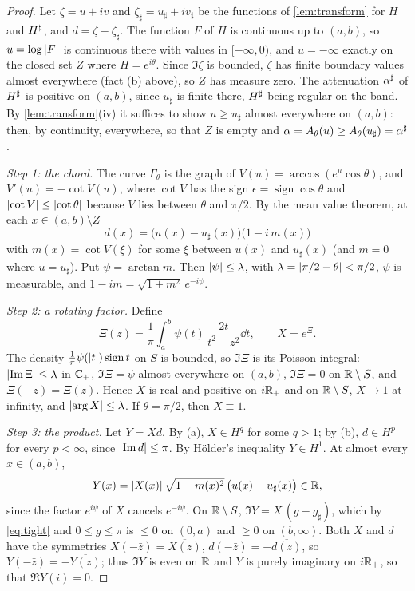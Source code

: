 \begin{proof}
Let $\zeta=u+iv$ and $\zeta_\sharp=u_\sharp+iv_\sharp$ be the functions of
\cref{lem:transform} for $H$ and $H^{\sharp}$, and $d=\zeta-\zeta_\sharp$. The function
$F$ of $H$ is continuous up to $(a,b)$, so $u=\log\left|F\right|$ is continuous there
with values in $[-\infty,0)$, and $u=-\infty$ exactly on the closed set $Z$
where $H=e^{i\theta}$. Since $\Im\zeta$ is bounded, $\zeta$ has finite boundary
values almost everywhere (fact (b) above), so $Z$ has measure zero. The
attenuation ${\alpha^{\sharp}}$ of $H^{\sharp}$ is positive on $(a,b)$, since $u_\sharp$ is finite
there, $H^{\sharp}$ being regular on the band. By \cref{lem:transform}(iv) it
suffices to show $u\ge u_\sharp$ almost everywhere on $(a,b)$: then, by
continuity, everywhere, so that $Z$ is empty and $\alpha=A_\theta(u)\ge
A_\theta(u_\sharp)={\alpha^{\sharp}}$.

\emph{Step 1: the chord.} The curve $\Gamma_\theta$ is the graph of
$V(u)=\arccos(e^u\cos\theta)$, and $V'(u)=-\cot V(u)$, where $\cot V$ has the sign
$\epsilon=\operatorname{sign}\cos\theta$ and $\left|\cot V\right|\le\left|\cot\theta\right|$ because
$V$ lies between $\theta$ and $\pi/2$. By the mean value theorem, at each
$x\in(a,b)\setminus Z$
\[
d(x)=\big(u(x)-u_\sharp(x)\big)\big(1-i\,m(x)\big)
\]
with $m(x)=\cot V(\xi)$ for some $\xi$ between $u(x)$ and $u_\sharp(x)$ (and $m=0$
where $u=u_\sharp$). Put $\psi=\arctan m$. Then $\left|\psi\right|\le\lambda$, with
$\lambda=\left|\pi/2-\theta\right|<\pi/2$, $\psi$ is measurable, and
$1-im=\sqrt{1+m^2}\,e^{-i\psi}$.

\emph{Step 2: a rotating factor.} Define
\[
\Xi(z)=\frac1\pi\int_a^b\psi(t)\,\frac{2t}{t^2-z^2}\dd t,\qquad X=e^\Xi .
\]
The density $\frac1\pi\psi(\left|t\right|)\operatorname{sign}t$ on $S$ is bounded, so $\Im\Xi$
is its Poisson integral: $\left|\operatorname{Im}\Xi\right|\le\lambda$ in $\mathbb C_{+}$, $\Im\Xi=\psi$ almost
everywhere on $(a,b)$, $\Im\Xi=0$ on $\mathbb R\setminus S$, and $\Xi(-\bar z)=\overline{\Xi(z)}$.
Hence $X$ is real and positive on $i\mathbb R_+$ and on $\mathbb R\setminus S$, $X\to1$ at
infinity, and $\left|\arg X\right|\le\lambda$. If $\theta=\pi/2$, then $X\equiv1$.

\emph{Step 3: the product.} Let $Y=Xd$. By (a), $X\in H^q$ for some $q>1$; by
(b), $d\in H^p$ for every $p<\infty$, since $\left|\operatorname{Im} d\right|\le\pi$. By H\"older's
inequality $Y\in H^1$. At almost every $x\in(a,b)$,
\begin{equation}\label{eq:Yband}
Y(x)=\left|X(x)\right|\sqrt{1+m(x)^2}\,\big(u(x)-u_\sharp(x)\big)\in\mathbb R ,
\end{equation}
since the factor $e^{i\psi}$ of $X$ cancels $e^{-i\psi}$. On $\mathbb R\setminus S$,
$\Im Y=X\,(g-g_\sharp)$, which by \eqref{eq:tight} and $0\le g\le\pi$ is $\le0$
on $(0,a)$ and $\ge0$ on $(b,\infty)$. Both $X$ and $d$ have the symmetries
$X(-\bar z)=\overline{X(z)}$, $d(-\bar z)=-\overline{d(z)}$, so
$Y(-\bar z)=-\overline{Y(z)}$; thus $\Im Y$ is even on $\mathbb R$ and $Y$ is purely
imaginary on $i\mathbb R_+$, so that $\Re Y(i)=0$.


\end{proof}

